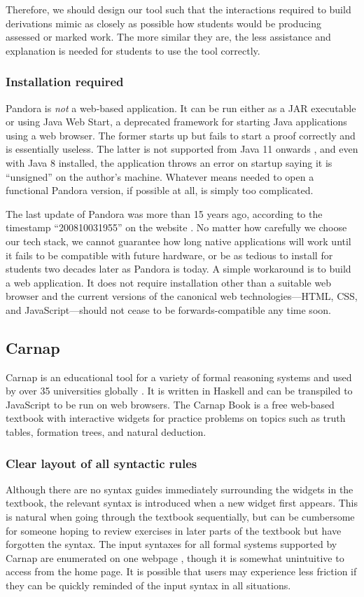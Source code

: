 Therefore, we should design our tool such that the interactions required to build derivations mimic as closely as possible how students would be producing assessed or marked work. The more similar they are, the less assistance and explanation is needed for students to use the tool correctly.

\subsubsection{Installation required}
Pandora is \textit{not} a web-based application. It can be run either as a JAR executable or using Java Web Start, a deprecated framework for starting Java applications using a web browser. The former starts up but fails to start a proof correctly and is essentially useless. The latter is not supported from Java 11 onwards \cite{oracle:2020}, and even with Java 8 installed, the application throws an error on startup saying it is ``unsigned'' on the author's machine. Whatever means needed to open a functional Pandora version, if possible at all, is simply too complicated.

The last update of Pandora was more than 15 years ago, according to the timestamp ``200810031955'' on the website \cite{pandora}. No matter how carefully we choose our tech stack, we cannot guarantee how long native applications will work until it fails to be compatible with future hardware, or be as tedious to install for students two decades later as Pandora is today. A simple workaround is to build a web application. It does not require installation other than a suitable web browser and the current versions of the canonical web technologies---HTML, CSS, and JavaScript---should not cease to be forwards-compatible any time soon.

\subsection{Carnap}
Carnap \cite{carnap, carnap:2018} is an educational tool for a variety of formal reasoning systems and used by over 35 universities globally \cite{carnap:about}. It is written in Haskell and can be transpiled to JavaScript to be run on web browsers. The Carnap Book \cite{carnap:book} is a free web-based textbook with interactive widgets for practice problems on topics such as truth tables, formation trees, and natural deduction.

\subsubsection{Clear layout of all syntactic rules}
 Although there are no syntax guides immediately surrounding the widgets in the textbook, the relevant syntax is introduced when a new widget first appears. This is natural when going through the textbook sequentially, but can be cumbersome for someone hoping to review exercises in later parts of the textbook but have forgotten the syntax. The input syntaxes for all formal systems supported by Carnap are enumerated on one webpage \cite{carnap:systems}, though it is somewhat unintuitive to access from the home page. It is possible that users may experience less friction if they can be quickly reminded of the input syntax in all situations.



